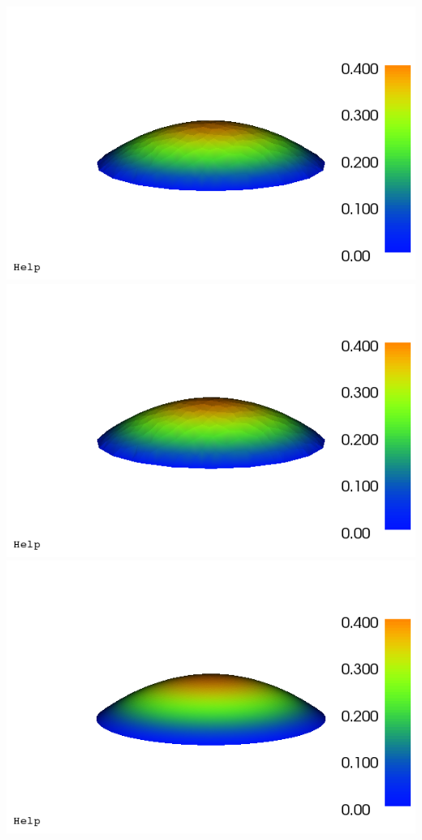 \documentclass{article}
\begin{document}
\begin{enumerate}
\includegraphics[scale=0.3]{dolfin_plot_2.png}
\includegraphics[scale=0.3]{dolfin_plot_3.png}\\
\includegraphics[scale=0.3]{dolfin_plot_4.png}

\end{enumerate}
\end{document}
